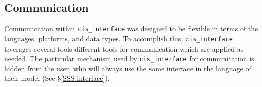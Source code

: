 \documentclass[journal]{IEEEtran}
\newcommand{\cis}{{\tt cis\_interface}{}}
\begin{document}
\subsection{Communication}\label{SS:communication}
%
Communication within {\cis} was designed to be flexible in terms of the 
languages, platforms, and data types. To accomplish this, {\cis} leverages 
several tools different tools for communication which are applied as needed. The 
particular mechanism used by {\cis} for communication is hidden from the 
user, who will always use the same interface in the language of their model 
(See \S\ref{SSS:interface}). 

\end{document}
